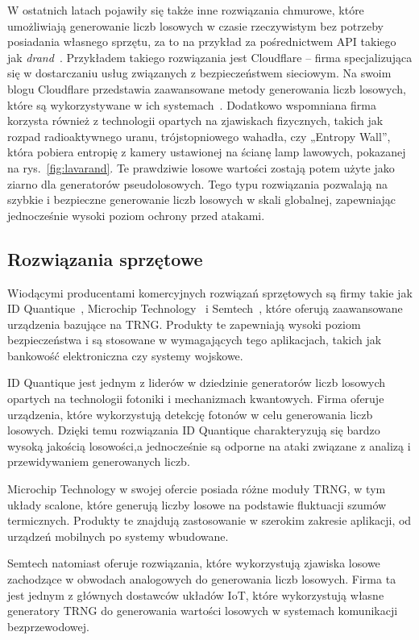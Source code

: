 W ostatnich latach pojawiły się także inne rozwiązania chmurowe, które umożliwiają generowanie liczb losowych w czasie rzeczywistym bez potrzeby posiadania własnego sprzętu,
za to na przykład za pośrednictwem API takiego jak \textit{drand}~\cite{drand_documentation}.
Przykładem takiego rozwiązania jest Cloudflare – firma specjalizująca się w dostarczaniu usług związanych z bezpieczeństwem sieciowym.
Na swoim blogu Cloudflare przedstawia zaawansowane metody generowania liczb losowych, które są wykorzystywane w ich systemach~\cite{cloudflare_league_of_entropy}.
Dodatkowo wspomniana firma korzysta również z technologii opartych na zjawiskach fizycznych, takich jak rozpad radioaktywnego uranu,
trójstopniowego wahadła, czy „Entropy Wall”, która pobiera entropię z kamery
ustawionej na ścianę lamp lawowych, pokazanej na rys.~\ref{fig:lavarand}.
Te prawdziwie losowe wartości zostają potem użyte jako ziarno dla generatorów pseudolosowych.
Tego typu rozwiązania pozwalają na szybkie i bezpieczne generowanie liczb losowych w skali globalnej, zapewniając jednocześnie wysoki poziom ochrony przed atakami.

\subsection{Rozwiązania sprzętowe}\label{subsec:rozwiazania-sprzetowe}
Wiodącymi producentami komercyjnych rozwiązań sprzętowych są firmy takie jak
ID Quantique~\cite{IDQ}, Microchip Technology~\cite{MicrochipTechnology} i Semtech~\cite{Semtech},
które oferują zaawansowane urządzenia bazujące na TRNG.
Produkty te zapewniają wysoki poziom bezpieczeństwa i są stosowane w wymagających tego aplikacjach,
takich jak bankowość elektroniczna czy systemy wojskowe.

ID Quantique jest jednym z liderów w dziedzinie generatorów liczb losowych opartych na technologii fotoniki i mechanizmach kwantowych.
Firma oferuje urządzenia, które wykorzystują detekcję fotonów w celu generowania liczb losowych.
Dzięki temu rozwiązania ID Quantique charakteryzują się bardzo wysoką jakością losowości,a jednocześnie są odporne na ataki związane z analizą i przewidywaniem generowanych liczb.

Microchip Technology w swojej ofercie posiada różne moduły TRNG, w tym układy scalone,
które generują liczby losowe na podstawie fluktuacji szumów termicznych.
Produkty te znajdują zastosowanie w szerokim zakresie aplikacji, od urządzeń mobilnych po systemy wbudowane.

Semtech natomiast oferuje rozwiązania, które wykorzystują zjawiska losowe
zachodzące w obwodach analogowych do generowania liczb losowych.
Firma ta jest jednym z głównych dostawców układów IoT, które wykorzystują własne generatory TRNG
do generowania wartości losowych w systemach komunikacji bezprzewodowej.


